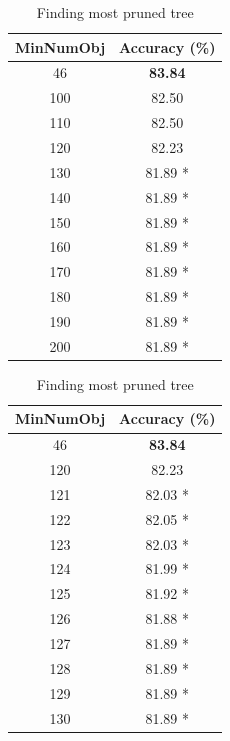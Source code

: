 \documentclass[12pt]{article}
\begin{document}
      \begin{table}[H]
        \begin{subtable}{0.5\linewidth}
          \centering
          \caption{}
          \begin{tabular}{c|c}
            \toprule
            MinNumObj & Accuracy (\%) \\
            \midrule
            46    & \textbf{83.84} \\
            \midrule
            100   & 82.50 \\
            110   & 82.50 \\
            120   & 82.23 \\
            130   & 81.89 * \\
            140   & 81.89 * \\
            150   & 81.89 * \\
            160   & 81.89 * \\
            170   & 81.89 * \\
            180   & 81.89 * \\
            190   & 81.89 * \\
            200   & 81.89 * \\
            \bottomrule
          \end{tabular}%
        \end{subtable}
        \begin{subtable}{0.5\linewidth}
          \centering
          \caption{}
            \begin{tabular}{c|c}
            \toprule
            MinNumObj & Accuracy (\%) \\
            \midrule
            46    & \textbf{83.84} \\
            \midrule
            120   & 82.23 \\
            121   & 82.03 * \\
            122   & 82.05 * \\
            123   & 82.03 * \\
            124   & 81.99 * \\
            125   & 81.92 * \\
            126   & 81.88 * \\
            127   & 81.89 * \\
            128   & 81.89 * \\
            129   & 81.89 * \\
            130   & 81.89 * \\
            \bottomrule
            \end{tabular}%
        \end{subtable}
        \caption{Finding most pruned tree}
        \label{tab:dt-mpt}%
      \end{table}%
\end{document}
